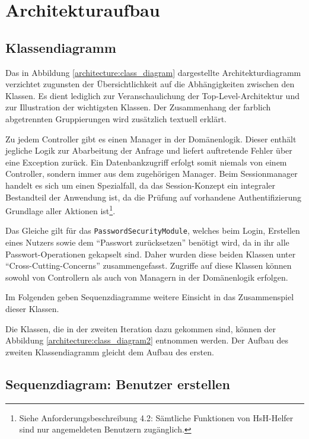\documentclass[12pt,DIV14,BCOR10mm,a4paper,parskip=half-,headsepline,headinclude,english,ngerman,bibliography=totocnumbered]{scrreprt}
\begin{document}
\vspace*{-3cm}

\tableofcontents  %

\chapter{Architekturaufbau}
\section{Klassendiagramm}

Das in Abbildung \ref{architecture:class_diagram} dargestellte Architekturdiagramm verzichtet zugunsten der Über\-sichtlichkeit auf die Abhängig\-keiten zwischen den Klassen. Es dient lediglich zur Veranschaulichung der Top-Level-Architektur und zur Illustration der wichtigsten Klassen. Der Zusammenhang der farblich abgetrennten Gruppierungen wird zusätzlich textuell erklärt.

Zu jedem Controller gibt es einen Manager in der Domänenlogik.
Dieser enthält jegliche Logik zur Abarbeitung der Anfrage und liefert auftretende Fehler über eine Exception zurück. Ein Datenbankzugriff erfolgt somit niemals von einem Controller, sondern immer aus dem zugehörigen Manager.
Beim Sessionmanager handelt es sich um einen Spezialfall, da das Session-Konzept ein integraler Bestandteil der Anwendung ist, da die Prüfung auf vorhandene Authentifizierung Grundlage aller Aktionen ist\footnote{Siehe Anforderungsbeschreibung 4.2: Sämtliche Funktionen von HsH-Helfer sind nur angemeldeten Benutzern zugänglich.}.

Das Gleiche gilt für das \texttt{PasswordSecurityModule}, welches beim Login, Erstellen eines Nutzers sowie dem \enquote{Passwort zurücksetzen} benötigt wird, da in ihr alle Passwort-Operationen gekapselt sind.
Daher wurden diese beiden Klassen unter \enquote{Cross-Cutting-Concerns} zusammengefasst.
Zugriffe auf diese Klassen können sowohl von Controllern als auch von Managern in der Domänenlogik erfolgen. \par
Im Folgenden geben Sequenzdiagramme weitere Einsicht in das Zusammenspiel dieser Klassen.

Die Klassen, die in der zweiten Iteration dazu gekommen sind, können der Abbildung \ref{architecture:class_diagram2} entnommen werden.
Der Aufbau des zweiten Klassendiagramm gleicht dem Aufbau des ersten.

\section{Sequenzdiagram: Benutzer erstellen}
\end{document}
